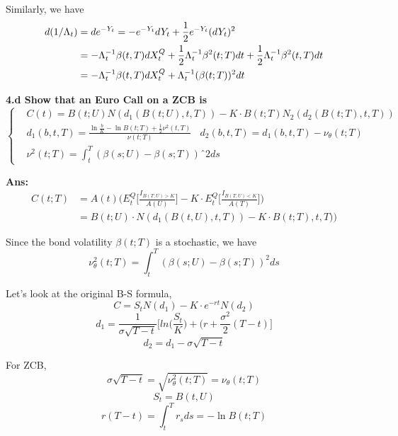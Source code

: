 \documentclass[11pt, notitlepage]{article}
\def\\ln{\mathrm{\ln}}
\def\\exp{\mathrm{\exp}}
\def\\max{\mathrm{\max}}
\def\d{\mathnormal{d}}
\begin{document}
Similarly, we have
\begin{equation*}
\begin{aligned}
\d (1/\Lambda_t)  &= \d e^{-Y_t} = - e^{-Y_t}\d Y_t+\frac{1}{2} e^{-Y_t} (\d Y_t)^2\\
& = - \Lambda_t^{-1} \beta (t,T)dX_t^Q + \frac{1}{2} \Lambda_t^{-1} \beta^2(t;T)dt + \frac{1}{2} \Lambda_t^{-1} \beta^2(t,T)dt\\
& = - \Lambda_t^{-1} \beta(t,T)dX_t^Q + \Lambda_t^{-1} (\beta(t;T))^2 \d t
\end{aligned}
\end{equation*}

\vspace{10mm}
\color{red}
\bfseries
4.d Show that an Euro Call on a ZCB is
\begin{equation*}
\left \{
  \begin{aligned}
    &C(t) = B(t;U)N(d_1(B(t;U), t, T)) - K\cdot B(t;T)N_2(d_2(B(t;T), t,T))\\
    &d_1(b,t,T) = \frac{\ln \frac{b}{K} - \ln B(t;T) + \frac{1}{2}\nu^2(t,T)}{\nu(t;T)}  ~~~~d_2(b,t,T) = d_1(b,t,T)-\nu_\theta(t;T) \\
    &\nu^2(t;T) = \int_t^T (\beta(s;U) - \beta(s;T))ˆ2 ds
  \end{aligned} \right.
\end{equation*}
\mdseries

\vspace{5mm}
\color{black}
\textbf {Ans:}
\begin{equation*}
\begin{aligned}
C(t;T) &= A(t)\bigg(E_t^Q\bigg[\frac{I_{B(T;U)>K}}{A(U)}\bigg] - K\cdot E_t^Q\bigg[\frac{I_{B(T,U)<K}}{A(T)}\bigg]\bigg) \\
&= B(t;U) \cdot N(d_1(B(t,U),t,T)) - K\cdot B(t;T), t,T))
\end{aligned}
\end{equation*}

Since the bond volatility $\beta (t;T)$ is a stochastic, we have
$$ \nu_\theta^2 (t;T) = \int^T_t(\beta(s;U) - \beta(s;T))^2 ds$$

Let's look at the original B-S formula,
$$ C = S_t N(d_1) - K \cdot e^{-rt}N(d_2) $$
$$ d_1 = \frac{1}{\sigma \sqrt{T-t}}\bigg[ln\bigg(\frac{S_t}{K}\bigg) + (r + \frac{\sigma^2}{2}(T-t) \bigg]$$
$$ d_2 = d_1 - \sigma \sqrt{T-t} $$

For ZCB,
 $$\sigma \sqrt{T-t} = \sqrt{\nu_\theta^2 (t;T)} = \nu_\theta (t;T) $$
 $$S_t = B(t,U)$$
 $$r(T-t) = \int^T_t r_sds = -\ln B(t;T)$$
 
\end{document}
